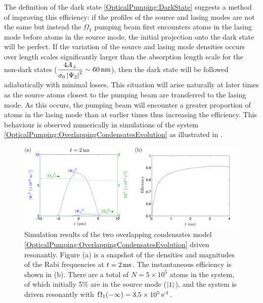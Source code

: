 The definition of the dark state \eqref{OpticalPumping:DarkState} suggests a method of improving this efficiency: if the profiles of the source and lasing modes are not the same but instead the $\Omega_1$ pumping beam first encounters atoms in the lasing mode before atoms in the source mode, the initial projection onto the dark state will be perfect.  If the variation of the source and lasing mode densities occurs over length scales significantly larger than the absorption length scale for the non-dark states ($\displaystyle \frac{4 A_\perp}{\sigma_0 \abs{\Psi_2}^2} \sim \unit[60]{nm}$), then the dark state will be followed adiabatically with minimal losses.  This situation will arise naturally at later times as the source atoms closest to the pumping beam are transferred to the lasing mode.  As this occurs, the pumping beam will encounter a greater proportion of atoms in the lasing mode than at earlier times thus increasing the efficiency.  This behaviour is observed numerically in simulations of the system \eqref{OpticalPumping:OverlappingCondensatesEvolution} as illustrated in .

\begin{figure}
    \centering
    \includegraphics[width=15cm]{OverlappingCondensatesZeroDetuning}
    \caption{Simulation results of the two overlapping condensates model \eqref{OpticalPumping:OverlappingCondensatesEvolution} driven resonantly.  Figure (a) is a snapshot of the densities and magnitudes of the Rabi frequencies at $t = \unit[2]{ms}$.  The instantaneous efficiency is shown in (b).  There are a total of $N = 5 \times 10^5$ atoms in the system, of which initially 5\% are in the source mode (${\left|1\right>}$), and the system is driven resonantly with $\Omega_1(-\infty) = 3.5 \times \unit[10^5]{s\textsuperscript{-1}}$.}
    \label{OpticalPumping:OverlappingCondensatesZeroDetuning}
\end{figure}

